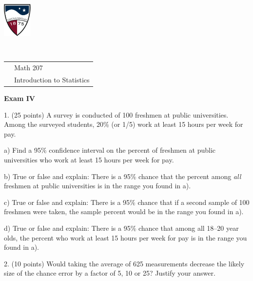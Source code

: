 \documentclass[10pt]{article}
\begin{document}
\href{http://www.su.edu}{\includegraphics[height=1.75cm]{sulogo.eps}}
\vspace{-1.69cm}

{{\ }\hfill\small
\begin{tabular}{cl}
& Math 207\\
& Introduction to Statistics\\
\end{tabular}
}
\begin{center}
\textbf{\large  Exam IV}
\end{center}
\medskip

1. (25 points) A survey is conducted of 100 freshmen at public universities.
Among the surveyed  students, 20\% (or 1/5) work at least 15 hours per week for pay.

\hspace{20pt} a) Find a 95\% confidence interval
on the  percent of freshmen at public universities who work at least 15 hours per week for pay.
\vspace{2.3in}

\hspace{20pt} b) True or false and explain:  There is a 95\% chance that the
percent among \textit{all} freshmen at public universities is in the range you found in a).
\vspace{1.5in}

\hspace{20pt} c) True or false and explain:  There is a 95\% chance that
if a second sample of 100 freshmen were taken,
the sample percent would be in the range you found in a).
\vspace{1.5in}


\hspace{20pt} d) True or false and explain:  There is a 95\% chance that 
 among all 18--20 year olds, the percent who work at least 15 hours per week for pay 
is in the range you found in a).
\vspace{1in}
\vfill
\eject
{\ }



2. (10 points)
Would taking the average of 625 measurements decrease
the likely size of the chance error by a factor of 5, 10 or 25? Justify your answer.
\vspace{1.5in}
\end{document}
